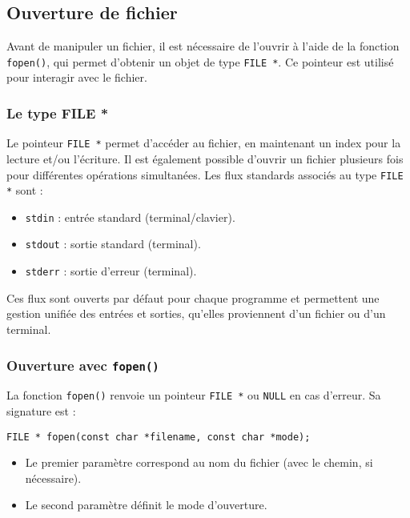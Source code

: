\documentclass[french,11pt]{article}
\begin{document}
\subsection{Ouverture de fichier}
Avant de manipuler un fichier, il est nécessaire de l’ouvrir à l’aide de la fonction \texttt{fopen()}, qui permet d’obtenir un objet de type \texttt{FILE *}. Ce pointeur est utilisé pour interagir avec le fichier.

\subsubsection{Le type FILE *}
Le pointeur \texttt{FILE *} permet d'accéder au fichier, en maintenant un index pour la lecture et/ou l’écriture. Il est également possible d’ouvrir un fichier plusieurs fois pour différentes opérations simultanées. Les flux standards associés au type \texttt{FILE *} sont :
\begin{itemize}
    \item \texttt{stdin} : entrée standard (terminal/clavier).
    \item \texttt{stdout} : sortie standard (terminal).
    \item \texttt{stderr} : sortie d’erreur (terminal).
\end{itemize}
Ces flux sont ouverts par défaut pour chaque programme et permettent une gestion unifiée des entrées et sorties, qu’elles proviennent d’un fichier ou d’un terminal.

\subsubsection{Ouverture avec \texttt{fopen()}}
La fonction \texttt{fopen()} renvoie un pointeur \texttt{FILE *} ou \texttt{NULL} en cas d’erreur. Sa signature est :
\begin{verbatim}
FILE * fopen(const char *filename, const char *mode);
\end{verbatim}
\begin{itemize}
    \item Le premier paramètre correspond au nom du fichier (avec le chemin, si nécessaire).
    \item Le second paramètre définit le mode d’ouverture.
\end{itemize}
\end{document}
